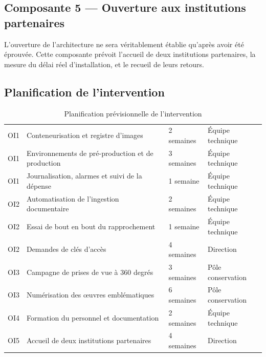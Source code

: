 \subsection{Composante 5 — Ouverture aux institutions partenaires}

L'ouverture de l'architecture ne sera véritablement établie qu'après avoir été
éprouvée. Cette composante prévoit l'accueil de deux institutions partenaires,
la mesure du délai réel d'installation, et le recueil de leurs retours.

\subsection{Planification de l'intervention}

\begin{table}[htbp]
\centering
\caption{Planification prévisionnelle de l'intervention}
\label{tab:planning}
\small
\begin{tabularx}{\textwidth}{|C{1.2cm}|X|C{2.4cm}|C{2.6cm}|}
\hline
{}
 &  &  &  \\ \hline
OI1 & Conteneurisation et registre d'images & 2 semaines & Équipe technique \\ \hline
OI1 & Environnements de pré-production et de production & 3 semaines & Équipe technique \\ \hline
OI1 & Journalisation, alarmes et suivi de la dépense & 1 semaine & Équipe technique \\ \hline
OI2 & Automatisation de l'ingestion documentaire & 2 semaines & Équipe technique \\ \hline
OI2 & Essai de bout en bout du rapprochement & 1 semaine & Équipe technique \\ \hline
OI2 & Demandes de clés d'accès & 4 semaines & Direction \\ \hline
OI3 & Campagne de prises de vue à 360 degrés & 3 semaines & Pôle conservation \\ \hline
OI3 & Numérisation des œuvres emblématiques & 6 semaines & Pôle conservation \\ \hline
OI4 & Formation du personnel et documentation & 2 semaines & Équipe technique \\ \hline
OI5 & Accueil de deux institutions partenaires & 4 semaines & Direction \\ \hline
\end{tabularx}
\end{table}

